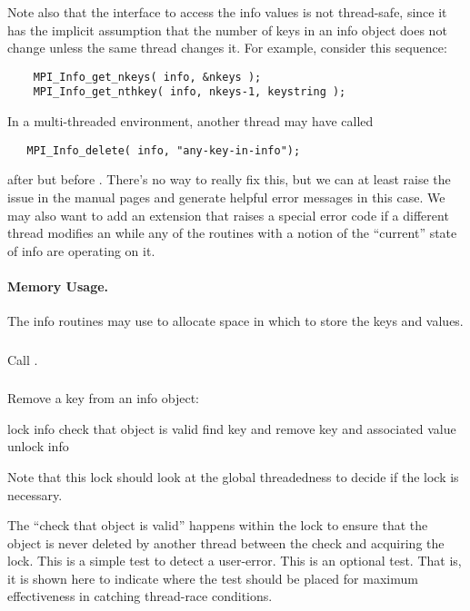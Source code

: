 \documentclass{article}
\begin{document}
Note also that the interface to access the info values is not
thread-safe, since it has the implicit assumption that the number of
keys in an info object does not change unless the same thread changes it.
For example, consider this sequence:
\begin{verbatim}
    MPI_Info_get_nkeys( info, &nkeys );
    MPI_Info_get_nthkey( info, nkeys-1, keystring );
\end{verbatim}
In a multi-threaded environment, another thread may have called
\begin{verbatim}
   MPI_Info_delete( info, "any-key-in-info");
\end{verbatim}
after  but before
.  There's no way to really fix this, but
we can at least raise the issue in the manual pages and generate
helpful error messages in this case.  We may also want to add an
extension that raises a special error code if a different thread
modifies an  while any of the routines with a notion of
the ``current'' state of info are operating on it.

\paragraph{Memory Usage.}
The info routines may use  to allocate space in
which to store the keys and values.  

\subsubsection{}
Call .

\subsubsection{}
Remove a key from an info object:
\begin{algorithm}
lock info
check that object is valid
find key and remove key and associated value
unlock info
\end{algorithm}
Note that this lock should look at the global threadedness to decide if
the lock is necessary.  

The ``check that object is valid'' happens within
the lock to ensure that the object is never deleted by another thread
between the check and acquiring the lock. This is a simple test to
detect a user-error.  This is an optional test.  That is, it is shown here to
indicate where the test should be placed for maximum effectiveness in catching
thread-race conditions.
\end{document}
